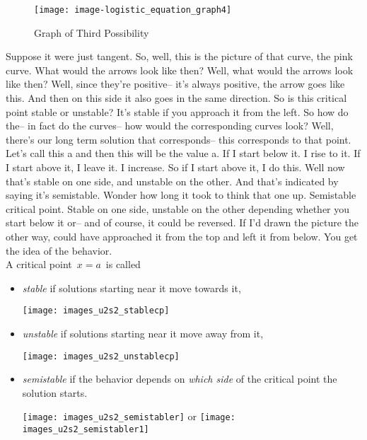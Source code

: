 \begin{wrapfigure}{r}{5.5cm}
  \texttt{[image: image-logistic\_equation\_graph4]}
  \caption{Graph of Third Possibility}
\end{wrapfigure}

Suppose it were just tangent.
So, well, this is the picture of that curve, the pink curve.
What would the arrows look like then?
Well, what would the arrows look like then?
Well, since they're positive--
it's always positive, the arrow goes like this.
And then on this side it also goes in the same direction.
So is this critical point stable or unstable?
It's stable if you approach it from the left.
So how do the-- in fact do the curves--
how would the corresponding curves look?
Well, there's our long term solution that corresponds--
this corresponds to that point.
Let's call this a and then this will be the value a.
If I start below it. I rise to it.
If I start above it, I leave it. I increase.
So if I start above it, I do this.
Well now that's stable on one side, and unstable on the other.
And that's indicated by saying it's semistable.
Wonder how long it took to think that one up.
Semistable critical point.
Stable on one side, unstable on the other depending
whether you start below it or-- and of course, it could be reversed.
If I'd drawn the picture the other way,
could have approached it from the top and left it from below.
You get the idea of the behavior.\\

A critical point $\,x=a \,$ is called

\begin{itemize}
\item \emph{\color{blue} stable} if solutions starting near it move towards it,

  \texttt{[image: images\_u2s2\_stablecp]}
  
\item \emph{\color{orange} unstable} if solutions starting near it move away from it,

  \texttt{[image: images\_u2s2\_unstablecp]}

\item \emph{semistable} if the behavior depends on \emph{which side} of
  the critical point the solution starts.
  
  \texttt{[image: images\_u2s2\_semistabler]}
  \quad or \quad  \texttt{[image: images\_u2s2\_semistabler1]}

\end{itemize}

